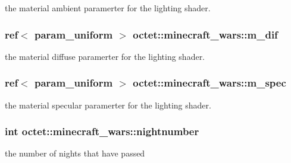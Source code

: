 the material ambient paramerter for the lighting shader. 

\hypertarget{classoctet_1_1minecraft__wars_a6e9f0bc04242d7dc02663e0d8a385865}{
\subsubsection[{m\+\_\+dif}]{\setlength{\rightskip}{0pt plus 5cm}ref$<$ param\+\_\+uniform $>$ octet\+::minecraft\+\_\+wars\+::m\+\_\+dif\hspace{0.3cm}{\ttfamily [private]}}}\label{classoctet_1_1minecraft__wars_a6e9f0bc04242d7dc02663e0d8a385865}


the material diffuse paramerter for the lighting shader. 

\hypertarget{classoctet_1_1minecraft__wars_a80007ff61c9366fbb63a374b224da78e}{
\subsubsection[{m\+\_\+spec}]{\setlength{\rightskip}{0pt plus 5cm}ref$<$ param\+\_\+uniform $>$ octet\+::minecraft\+\_\+wars\+::m\+\_\+spec\hspace{0.3cm}{\ttfamily [private]}}}\label{classoctet_1_1minecraft__wars_a80007ff61c9366fbb63a374b224da78e}


the material specular paramerter for the lighting shader. 

\hypertarget{classoctet_1_1minecraft__wars_a40e43deac31fa350abac00c6bb6eab75}{
\subsubsection[{nightnumber}]{\setlength{\rightskip}{0pt plus 5cm}int octet\+::minecraft\+\_\+wars\+::nightnumber\hspace{0.3cm}{\ttfamily [private]}}}\label{classoctet_1_1minecraft__wars_a40e43deac31fa350abac00c6bb6eab75}


the number of nights that have passed 


